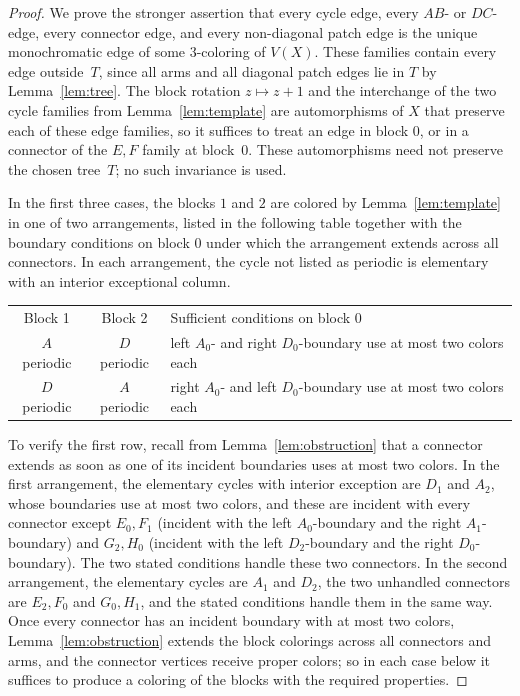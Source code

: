 \documentclass[11pt,letterpaper]{article}
\numberwithin{equation}{section}
\theoremstyle{plain}
\theoremstyle{definition}
\theoremstyle{remark}
\begin{document}
\begin{proof}
We prove the stronger assertion that every cycle edge, every $AB$- or $DC$-edge, every connector edge, and every non-diagonal patch edge is the unique monochromatic edge of some $3$-coloring of $V(X)$. These families contain every edge outside~$T$, since all arms and all diagonal patch edges lie in $T$ by Lemma~\ref{lem:tree}. The block rotation $z\mapsto z+1$ and the interchange of the two cycle families from Lemma~\ref{lem:template} are automorphisms of $X$ that preserve each of these edge families, so it suffices to treat an edge in block $0$, or in a connector of the $E,F$ family at block~$0$. These automorphisms need not preserve the chosen tree~$T$; no such invariance is used.

In the first three cases, the blocks $1$ and $2$ are colored by Lemma~\ref{lem:template} in one of two arrangements, listed in the following table together with the boundary conditions on block $0$ under which the arrangement extends across all connectors. In each arrangement, the cycle not listed as periodic is elementary with an interior exceptional column.
\begin{center}
  \begin{tabular}{ccl}
    Block 1 & Block 2 & Sufficient conditions on block 0\\[2pt]
    $A$ periodic & $D$ periodic & left $A_0$- and right $D_0$-boundary use at most two colors each\\
    $D$ periodic & $A$ periodic & right $A_0$- and left $D_0$-boundary use at most two colors each
  \end{tabular}
\end{center}
To verify the first row, recall from Lemma~\ref{lem:obstruction} that a connector extends as soon as one of its incident boundaries uses at most two colors. In the first arrangement, the elementary cycles with interior exception are $D_1$ and $A_2$, whose boundaries use at most two colors, and these are incident with every connector except $E_0,F_1$ (incident with the left $A_0$-boundary and the right $A_1$-boundary) and $G_2,H_0$ (incident with the left $D_2$-boundary and the right $D_0$-boundary). The two stated conditions handle these two connectors. In the second arrangement, the elementary cycles are $A_1$ and $D_2$, the two unhandled connectors are $E_2,F_0$ and $G_0,H_1$, and the stated conditions handle them in the same way. Once every connector has an incident boundary with at most two colors, Lemma~\ref{lem:obstruction} extends the block colorings across all connectors and arms, and the connector vertices receive proper colors; so in each case below it suffices to produce a coloring of the blocks with the required properties.


\end{proof}
\end{document}
